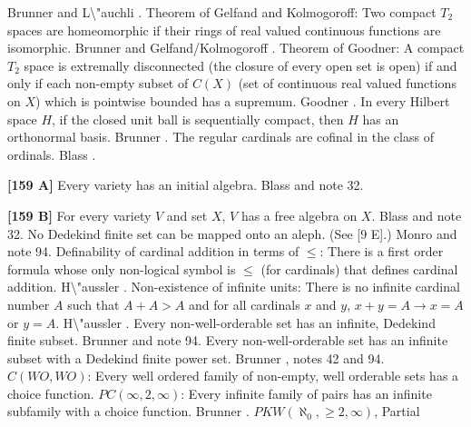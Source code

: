 \ac{Brunner} \cite{1983a} and \ac{L\"auchli} \cite{1962}.
\medskip
{} Theorem of Gelfand and Kolmogoroff: Two compact
$T_2$ spaces are  homeomorphic if their rings of real valued continuous
functions are isomorphic. \newline \ac{Brunner} \cite{1983a} and
\ac{Gelfand/Kolmogoroff} \cite{1939}. 
\medskip
{} Theorem of Goodner: A compact $T_{2}$ space is
extremally disconnected (the closure of every open set is open) if and
only if each non-empty subset of $C(X)$ (set of continuous real valued
functions on $X$) which is pointwise bounded has a supremum. \ac{Goodner}
\cite{1950}. 
\medskip
{} In every Hilbert space $H$, if the closed unit
ball is sequentially compact, then $H$ has an orthonormal basis.
\ac{Brunner} \cite{1983b}.
\medskip
{} The regular cardinals are cofinal in the class of
ordinals.  \ac{Blass} \cite{1983b}.
\smallskip
\item{}{\bf [159 A]} Every variety has an initial algebra. \ac{Blass}
\cite{1983b} and note 32.
\smallskip
\item{}{\bf [159 B]}  For every variety $V$ and set $X$, $V$ has a free
algebra on $X$.  \ac{Blass} \cite{1983b} and note 32.
\medskip
{} No Dedekind finite set can be mapped
onto an aleph. (See [9 E].)  \ac{Monro} \cite{1975} and note 94.
\medskip
{}  Definability of cardinal addition in terms of
$\le$: There is a first order formula whose only non-logical symbol is $\le$
(for cardinals) that defines cardinal addition. \ac{H\"aussler} \cite{1983}.
\medskip
{} Non-existence of infinite units: There is no
infinite cardinal number $A$ such that $A + A > A$  and for all cardinals
$x$ and $y$, $x + y = A\rightarrow x = A$ or $y = A$. \ac{H\"aussler}
\cite{1983}.
\medskip
{}  Every non-well-orderable set has an infinite,
Dedekind finite subset.  \ac{Brunner} \cite{1982a} and note 94.
\medskip
{} Every non-well-orderable set has an infinite subset
with a Dedekind finite power set. \ac{Brunner} \cite{1982a}, notes 42
and 94.
\medskip
{}  $C(WO,WO)$:  Every well ordered family of
non-empty, well orderable sets has a choice function.
\medskip
{} $PC(\infty,2,\infty)$: Every infinite family of
pairs has an infinite subfamily with a choice function. \ac{Brunner}
\cite{1982a}.
\medskip
{} $PKW(\aleph_{0},\ge 2,\infty)$, Partial
